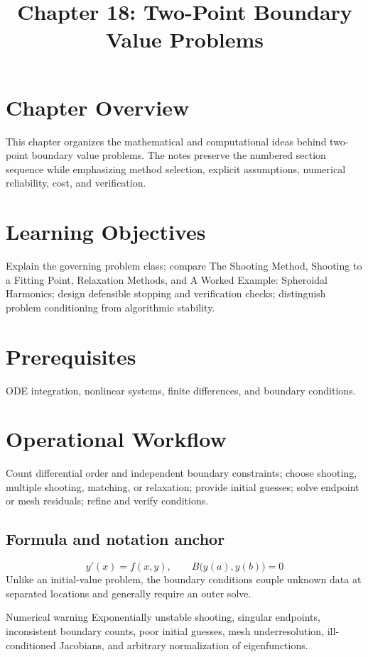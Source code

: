 \documentclass[10pt,letterpaper]{article}
\title{Chapter 18: Two-Point Boundary Value Problems}
\author{}
\date{}
\begin{document}
\maketitle

\section*{Chapter Overview}
This chapter organizes the mathematical and computational ideas behind two-point boundary value problems. The notes preserve the numbered section sequence while emphasizing method selection, explicit assumptions, numerical reliability, cost, and verification.

\section*{Learning Objectives}
Explain the governing problem class; compare The Shooting Method, Shooting to a Fitting Point, Relaxation Methods, and A Worked Example: Spheroidal Harmonics; design defensible stopping and verification checks; distinguish problem conditioning from algorithmic stability.

\section*{Prerequisites}
ODE integration, nonlinear systems, finite differences, and boundary conditions.

\section*{Operational Workflow}
Count differential order and independent boundary constraints; choose shooting, multiple shooting, matching, or relaxation; provide initial guesses; solve endpoint or mesh residuals; refine and verify conditions.

\subsection*{Formula and notation anchor}
\[
y'(x)=f(x,y),\qquad B\bigl(y(a),y(b)\bigr)=0
\]
Unlike an initial-value problem, the boundary conditions couple unknown data at separated locations and generally require an outer solve.

\begin{warnbox}{Numerical warning}
Exponentially unstable shooting, singular endpoints, inconsistent boundary counts, poor initial guesses, mesh underresolution, ill-conditioned Jacobians, and arbitrary normalization of eigenfunctions.
\end{warnbox}
\end{document}
